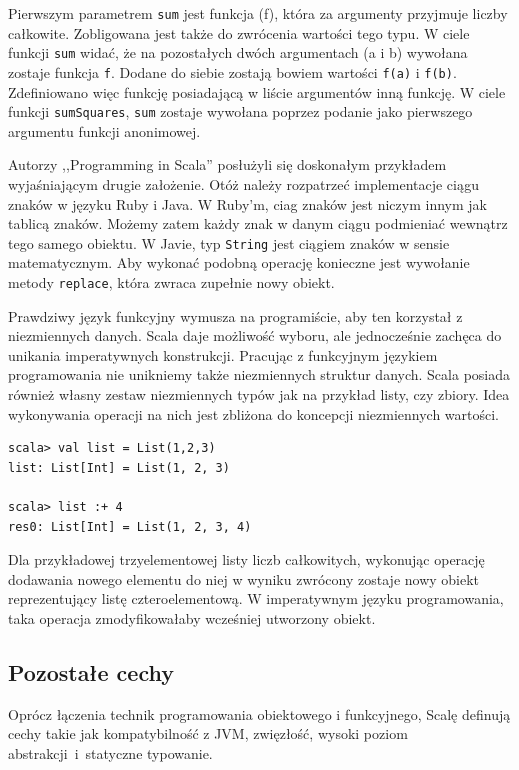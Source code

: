 \documentclass[wimgr]{xmgr}
\begin{document}
Pierwszym parametrem \texttt{sum} jest funkcja (f), która za argumenty przyjmuje liczby całkowite. Zobligowana jest także do zwrócenia wartości tego typu. W ciele funkcji \texttt{sum} widać, że na pozostałych dwóch argumentach (a i b) wywołana zostaje funkcja \texttt{f}. Dodane do siebie zostają bowiem wartości \texttt{f(a)} i \texttt{f(b)}. Zdefiniowano więc funkcję posiadającą w liście argumentów inną funkcję. W ciele funkcji \texttt{sumSquares}, \texttt{sum} zostaje wywołana poprzez podanie jako pierwszego argumentu funkcji anonimowej.

Autorzy ,,Programming in Scala'' posłużyli się doskonałym przykładem wyjaśniającym drugie założenie. \cite[s.57]{Odersky:2010:PIS} Otóż należy rozpatrzeć implementacje ciągu znaków w języku Ruby i Java. W Ruby'm, ciag znaków jest niczym innym jak tablicą znaków. Możemy zatem każdy znak w danym ciągu podmieniać wewnątrz tego samego obiektu. W Javie, typ \texttt{String} jest ciągiem znaków w sensie matematycznym. Aby wykonać podobną operację konieczne jest wywołanie metody \texttt{replace}, która zwraca zupełnie nowy obiekt.

Prawdziwy język funkcyjny wymusza na programiście, aby ten korzystał z niezmiennych danych. Scala daje możliwość wyboru, ale jednocześnie zachęca do unikania imperatywnych konstrukcji. Pracując z funkcyjnym językiem programowania nie unikniemy także niezmiennych struktur danych. Scala posiada również własny zestaw niezmiennych typów jak na przykład listy, czy zbiory. Idea wykonywania operacji na nich jest zbliżona do koncepcji niezmiennych wartości.

\begin{verbatim}
scala> val list = List(1,2,3)
list: List[Int] = List(1, 2, 3)

scala> list :+ 4
res0: List[Int] = List(1, 2, 3, 4)
\end{verbatim}

Dla przykładowej trzyelementowej listy liczb całkowitych, wykonując operację dodawania nowego elementu do niej w wyniku zwrócony zostaje nowy obiekt reprezentujący listę czteroelementową. W imperatywnym języku programowania, taka operacja zmodyfikowałaby wcześniej utworzony obiekt. 

\subsection{Pozostałe cechy}

Oprócz łączenia technik programowania obiektowego i funkcyjnego, Scalę definują cechy takie jak kompatybilność z JVM, zwięzłość, wysoki poziom abstrakcji~i~statyczne typowanie. 
\end{document}

